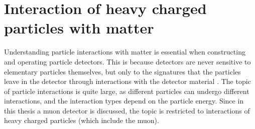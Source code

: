 \label{sec:Detectors}

\FloatBarrier
\section{Interaction of heavy charged particles with matter}
\label{sec:Interactions}

Understanding particle interactions with matter is essential when constructing and operating particle detectors. This is because detectors are never sensitive to elementary particles themselves, but only to the signatures that the particles leave in the detector through interactions with the detector material \cite{Book-KolanoskiWermes}. The topic of particle interactions is quite large, as different particles can undergo different interactions, and the interaction types depend on the particle energy. Since in this thesis a muon detector is discussed, the topic is restricted to interactions of heavy charged particles (which include the muon).
